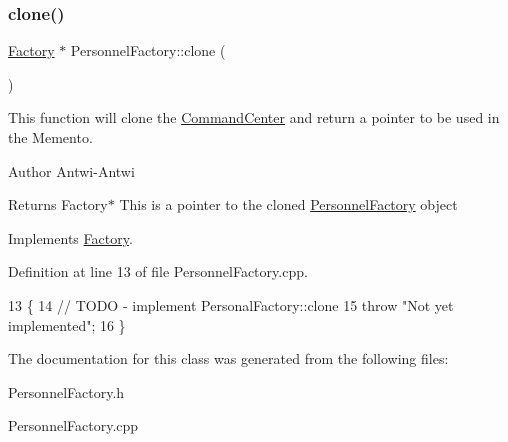 \subsubsection{\texorpdfstring{clone()}{clone()}}
{\footnotesize\ttfamily \hyperlink{classFactory}{Factory} $\ast$ Personnel\+Factory\+::clone (\begin{DoxyParamCaption}{ }\end{DoxyParamCaption})\hspace{0.3cm}{\ttfamily [virtual]}}



This function will clone the \hyperlink{classCommandCenter}{Command\+Center} and return a pointer to be used in the Memento. 

\begin{DoxyAuthor}{Author}
Antwi-\/\+Antwi
\end{DoxyAuthor}
\begin{DoxyReturn}{Returns}
Factory$\ast$ This is a pointer to the cloned \hyperlink{classPersonnelFactory}{Personnel\+Factory} object 
\end{DoxyReturn}


Implements \hyperlink{classFactory_a00881ec5050751e4b747db5dfd266192}{Factory}.



Definition at line 13 of file Personnel\+Factory.\+cpp.


\begin{DoxyCode}
13                                  \{
14     \textcolor{comment}{// TODO - implement PersonalFactory::clone}
15     \textcolor{keywordflow}{throw} \textcolor{stringliteral}{"Not yet implemented"};
16 \}
\end{DoxyCode}


The documentation for this class was generated from the following files\+:\begin{DoxyCompactItemize}
\item 
Personnel\+Factory.\+h\item 
Personnel\+Factory.\+cpp\end{DoxyCompactItemize}
